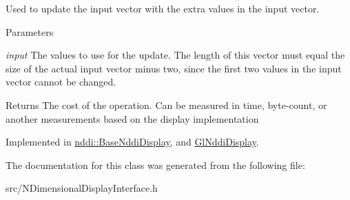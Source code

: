 Used to update the input vector with the extra values in the input vector. 


\begin{DoxyParams}{Parameters}
\item[{\em input}]The values to use for the update. The length of this vector must equal the size of the actual input vector minus two, since the first two values in the input vector cannot be changed. \end{DoxyParams}
\begin{DoxyReturn}{Returns}
The cost of the operation. Can be measured in time, byte-\/count, or another measurements based on the display implementation 
\end{DoxyReturn}


Implemented in \hyperlink{classnddi_1_1_base_nddi_display_ad6e5385ce6ea17f11e3ea404a123d1d7}{nddi::BaseNddiDisplay}, and \hyperlink{class_gl_nddi_display_ac6ed1d3cbad4ad321d3f5649a358717f}{GlNddiDisplay}.



The documentation for this class was generated from the following file:\begin{DoxyCompactItemize}
\item 
src/NDimensionalDisplayInterface.h\end{DoxyCompactItemize}
